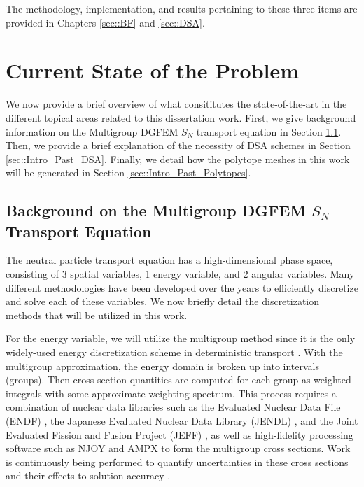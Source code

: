 \noindent The methodology, implementation, and results pertaining to these three items are provided in Chapters \ref{sec::BF} and \ref{sec::DSA}.

\section{Current State of the Problem}
\label{sec::Intro_Past}

We now provide a brief overview of what consititutes the state-of-the-art in the different topical areas related to this dissertation work. First, we give background information on the Multigroup DGFEM $S_N$ transport equation in Section \ref{sec::Intro_Past_DGFEMMGSn}. Then, we provide a brief explanation of the necessity of DSA schemes in Section \ref{sec::Intro_Past_DSA}. Finally, we detail how the polytope meshes in this work will be generated in Section \ref{sec::Intro_Past_Polytopes}.

\subsection{Background on the Multigroup DGFEM $S_N$ Transport Equation}
\label{sec::Intro_Past_DGFEMMGSn}

The neutral particle transport equation has a high-dimensional phase space, consisting of 3 spatial variables, 1 energy variable, and 2 angular variables. Many different methodologies have been developed over the years to efficiently discretize and solve each of these variables. We now briefly detail the discretization methods that will be utilized in this work.

For the energy variable, we will utilize the multigroup method since it is the only widely-used energy discretization scheme in deterministic transport \cite{duderstadt1976nuclear,bell1979nuclear}. With the multigroup approximation, the energy domain is broken up into intervals (groups). Then cross section quantities are computed for each group as weighted integrals with some approximate weighting spectrum. This process requires a combination of nuclear data libraries such as the Evaluated Nuclear Data File (ENDF) \cite{chadwick2006endf,chadwick2011endf}, the Japanese Evaluated Nuclear Data Library (JENDL) \cite{shibata2002japanese}, and the Joint Evaluated Fission and Fusion Project (JEFF) \cite{koning2006jeff}, as well as high-fidelity processing software such as NJOY \cite{macfarlane2002njoy,kahler2012njoy} and AMPX \cite{dunn2002ampx} to form the multigroup cross sections. Work is continuously being performed to quantify uncertainties in these cross sections and their effects to solution accuracy \cite{aliberti2006nuclear,jessee2008cross}.

